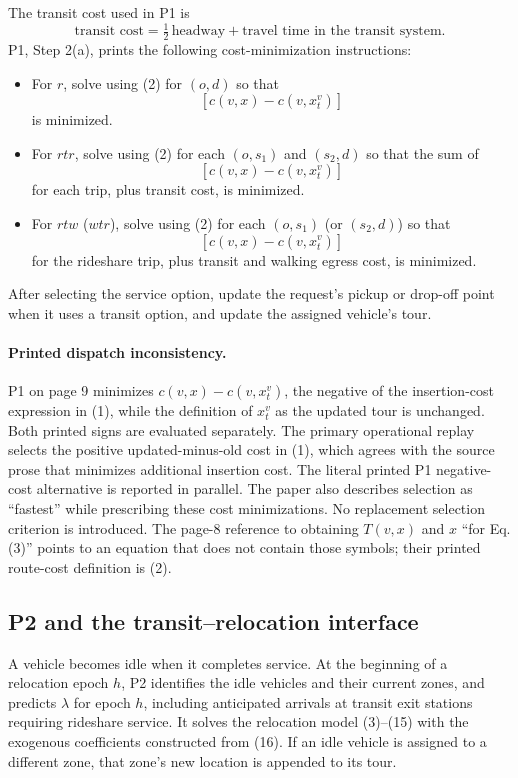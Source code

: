 \documentclass{article}
\begin{document}
The transit cost used in P1 is
\[
\text{transit cost}
=\tfrac12\,\text{headway}+\text{travel time in the transit system}.
\]
P1, Step 2(a), prints the following cost-minimization instructions:
\begin{itemize}
\item For $r$, solve using (2) for $(o,d)$ so that
\[
[c(v,x)-c(v,x_t^v)]
\]
is minimized.
\item For $rtr$, solve using (2) for each $(o,s_1)$ and $(s_2,d)$ so that the sum of
\[
[c(v,x)-c(v,x_t^v)]
\]
for each trip, plus transit cost, is minimized.
\item For $rtw$ ($wtr$), solve using (2) for each $(o,s_1)$ (or $(s_2,d)$) so that
\[
[c(v,x)-c(v,x_t^v)]
\]
for the rideshare trip, plus transit and walking egress cost, is minimized.
\end{itemize}
After selecting the service option, update the request's pickup or drop-off point when it uses a transit option, and update the assigned vehicle's tour.

\paragraph{Printed dispatch inconsistency.}
P1 on page 9 minimizes $c(v,x)-c(v,x_t^v)$, the negative of the insertion-cost expression in (1), while the definition of $x_t^v$ as the updated tour is unchanged. Both printed signs are evaluated separately. The primary operational replay selects the positive updated-minus-old cost in (1), which agrees with the source prose that minimizes additional insertion cost. The literal printed P1 negative-cost alternative is reported in parallel. The paper also describes selection as ``fastest'' while prescribing these cost minimizations. No replacement selection criterion is introduced. The page-8 reference to obtaining $T(v,x)$ and $x$ ``for Eq. (3)'' points to an equation that does not contain those symbols; their printed route-cost definition is (2).

\subsection*{P2 and the transit--relocation interface}
A vehicle becomes idle when it completes service. At the beginning of a relocation epoch $h$, P2 identifies the idle vehicles and their current zones, and predicts $\lambda$ for epoch $h$, including anticipated arrivals at transit exit stations requiring rideshare service. It solves the relocation model (3)--(15) with the exogenous coefficients constructed from (16). If an idle vehicle is assigned to a different zone, that zone's new location is appended to its tour.
\end{document}
